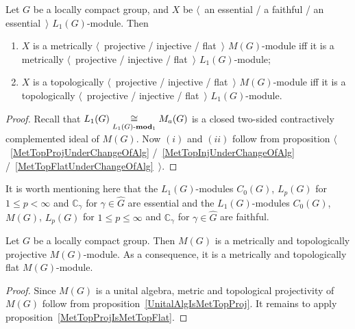 \begin{proposition}\label{MGMetTopProjInjFlatRedToL1} Let $G$ be a locally
compact group, and $X$ be $\langle$~an essential / a faithful / an essential~$\rangle$
$L_1(G)$-module. Then

\begin{enumerate}[label = (\roman*)]
    \item $X$ is a metrically $\langle$~projective / injective / flat~$\rangle$
    $M(G)$-module iff it is a metrically $\langle$~projective / injective /
    flat~$\rangle$ $L_1(G)$-module;

    \item $X$ is a topologically $\langle$~projective / injective / flat~$\rangle$
    $M(G)$-module iff it is a topologically $\langle$~projective / injective /
    flat~$\rangle$ $L_1(G)$-module.
\end{enumerate}
\end{proposition}
\begin{proof} Recall that $L_1(G)\mathrel{\mathop{\cong}\limits_{L_1(G)\text{-}\mathbf{mod}_1}}M_a(G)$ is a
closed two-sided contractively complemented ideal of $M(G)$. Now $(i)$ and $(ii)$
follow from proposition $\langle$~\ref{MetTopProjUnderChangeOfAlg}
/~\ref{MetTopInjUnderChangeOfAlg}  /~\ref{MetTopFlatUnderChangeOfAlg}~$\rangle$.
\end{proof} 

It is worth mentioning here that the $L_1(G)$-modules $C_0(G)$, $L_p(G)$ for
$1\leq p<\infty$ and $\mathbb{C}_\gamma$ for $\gamma\in\widehat{G}$ are
essential and the $L_1(G)$-modules $C_0(G)$, $M(G)$, $L_p(G)$ for $1\leq p\leq
\infty$ and $\mathbb{C}_\gamma$ for $\gamma\in\widehat{G}$ are faithful. 

\begin{proposition}\label{MGModMGMetTopProjFlatCharac} Let $G$ be a locally
compact group. Then $M(G)$ is a metrically and topologically projective
$M(G)$-module. As a consequence, it is a metrically and topologically flat
$M(G)$-module.
\end{proposition} 
\begin{proof} Since $M(G)$ is a unital algebra, metric and topological
projectivity of $M(G)$ follow from proposition~\ref{UnitalAlgIsMetTopProj}. It
remains to apply proposition~\ref{MetTopProjIsMetTopFlat}.
\end{proof}


